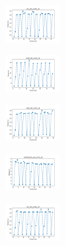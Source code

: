 \begin{figure}[H]    
    \centering
    \begin{subfigure}
        \centering
        \includegraphics[width=0.234\textwidth]{img/ils-es/iris_set_const_10_949004259_time.png}
    \end{subfigure}
    \hfill
    \begin{subfigure}
        \centering
        \includegraphics[width=0.234\textwidth]{img/ils-es/ecoli_set_const_10_949004259_time.png}
    \end{subfigure}
    \hfill
    \begin{subfigure}
        \centering
        \includegraphics[width=0.234\textwidth]{img/ils-es/rand_set_const_10_949004259_time.png}
    \end{subfigure}
    \hfill
    \begin{subfigure}
        \centering
        \includegraphics[width=0.234\textwidth]{img/ils-es/newthyroid_set_const_10_949004259_time.png}
    \end{subfigure}
    \hfill
    \begin{subfigure}
        \centering
        \includegraphics[width=0.234\textwidth]{img/ils-es/iris_set_const_10_589741062_time.png}
    \end{subfigure}

\end{figure}
